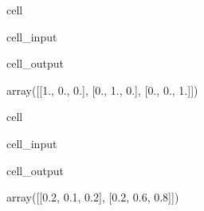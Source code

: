 \documentclass[letterpaper,10pt,english]{jupyterBook}
\begin{document}
\begin{sphinxuseclass}{cell}\begin{sphinxVerbatimInput}

\begin{sphinxuseclass}{cell_input}
\begin{sphinxVerbatim}[commandchars=\\\{\}]
  
\end{sphinxVerbatim}

\end{sphinxuseclass}\end{sphinxVerbatimInput}
\begin{sphinxVerbatimOutput}

\begin{sphinxuseclass}{cell_output}
\begin{sphinxVerbatim}[commandchars=\\\{\}]
array([[1., 0., 0.],
       [0., 1., 0.],
       [0., 0., 1.]])
\end{sphinxVerbatim}

\end{sphinxuseclass}\end{sphinxVerbatimOutput}

\end{sphinxuseclass}
\begin{sphinxuseclass}{cell}\begin{sphinxVerbatimInput}

\begin{sphinxuseclass}{cell_input}
\begin{sphinxVerbatim}[commandchars=\\\{\}]
\end{sphinxVerbatim}

\end{sphinxuseclass}\end{sphinxVerbatimInput}
\begin{sphinxVerbatimOutput}

\begin{sphinxuseclass}{cell_output}
\begin{sphinxVerbatim}[commandchars=\\\{\}]
array([[0.2, 0.1, 0.2],
       [0.2, 0.6, 0.8]])
\end{sphinxVerbatim}

\end{sphinxuseclass}\end{sphinxVerbatimOutput}

\end{sphinxuseclass}
\end{document}
